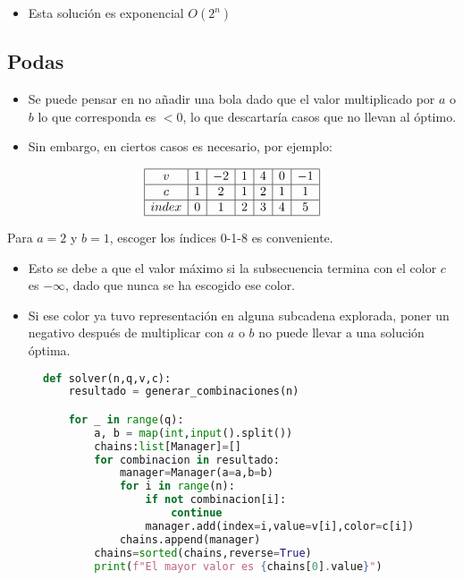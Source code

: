 \documentclass{article}
\begin{document}
\begin{itemize}
    \item Esta solución es exponencial $O(2^n)$
\end{itemize}

\subsection{Podas}
\begin{itemize}
    \item Se puede pensar en no añadir una bola dado que el valor multiplicado por $a$ o $b$ lo que corresponda es $< 0$, lo que descartaría casos que no llevan al óptimo.
    \item Sin embargo, en ciertos casos es necesario, por ejemplo:
\end{itemize}

\[
\begin{array}{|c|c|c|c|c|c|c|}
\hline
v & 1 & -2 & 1 & 4 & 0 & -1 \\
\hline
c & 1 & 2 & 1 & 2 & 1 & 1 \\
\hline
index & 0 & 1 & 2 & 3 & 4 & 5 \\
\hline
\end{array}
\]

Para $a=2$ y $b=1$, escoger los índices 0-1-8 es conveniente.
\begin{itemize}
    \item Esto se debe a que el valor máximo si la subsecuencia termina con el color $c$ es $-\infty$, dado que nunca se ha escogido ese color.
    \item Si ese color ya tuvo representación en alguna subcadena explorada, poner un negativo después de multiplicar con $a$ o $b$ no puede llevar a una solución óptima.
\end{itemize}
\begin{figure}[H]
    \centering

\begin{lstlisting}[language=Python]
    def solver(n,q,v,c):
    resultado = generar_combinaciones(n)

    for _ in range(q):
        a, b = map(int,input().split())
        chains:list[Manager]=[]
        for combinacion in resultado:
            manager=Manager(a=a,b=b)
            for i in range(n):
                if not combinacion[i]:
                    continue
                manager.add(index=i,value=v[i],color=c[i])
            chains.append(manager)
        chains=sorted(chains,reverse=True)
        print(f"El mayor valor es {chains[0].value}")
    \end{lstlisting}
\end{figure}
\end{document}
